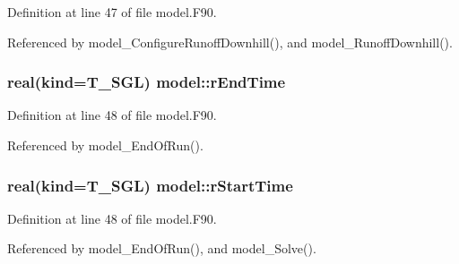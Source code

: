 Definition at line 47 of file model.F90.



Referenced by model\_\-ConfigureRunoffDownhill(), and model\_\-RunoffDownhill().

\hypertarget{namespacemodel_a0543ca4ff4a5abe0454b315150c96261}{
\subsubsection[{rEndTime}]{\setlength{\rightskip}{0pt plus 5cm}real(kind=T\_\-SGL) {\bf model::rEndTime}}}
\label{namespacemodel_a0543ca4ff4a5abe0454b315150c96261}


Definition at line 48 of file model.F90.



Referenced by model\_\-EndOfRun().

\hypertarget{namespacemodel_af6e6b71a83c27f7935909506664b8c8f}{
\subsubsection[{rStartTime}]{\setlength{\rightskip}{0pt plus 5cm}real(kind=T\_\-SGL) {\bf model::rStartTime}}}
\label{namespacemodel_af6e6b71a83c27f7935909506664b8c8f}


Definition at line 48 of file model.F90.



Referenced by model\_\-EndOfRun(), and model\_\-Solve().

